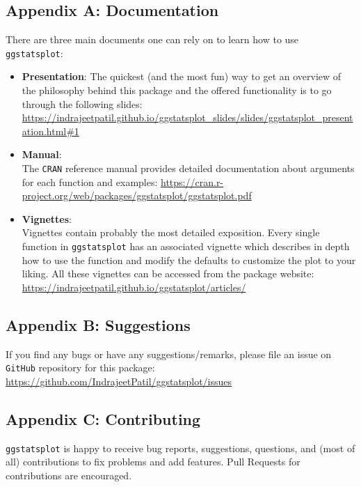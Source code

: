 \documentclass[
]{article}
\begin{document}
\hypertarget{appendix-a-documentation}{%
\subsection{Appendix A: Documentation}\label{appendix-a-documentation}}

There are three main documents one can rely on to learn how to use
\texttt{ggstatsplot}:

\begin{itemize}
\item
  \textbf{Presentation}:
  The quickest (and the most fun) way to get an overview of
  the philosophy behind this package and the offered functionality is to go
  through the following slides:
  \url{https://indrajeetpatil.github.io/ggstatsplot_slides/slides/ggstatsplot_presentation.html\#1}
\item
  \textbf{Manual}:\\
  The \texttt{CRAN} reference manual provides detailed documentation about arguments
  for each function and examples:
  \url{https://cran.r-project.org/web/packages/ggstatsplot/ggstatsplot.pdf}
\item
  \textbf{Vignettes}:\\
  Vignettes contain probably the most detailed exposition. Every single
  function in \texttt{ggstatsplot} has an associated vignette which describes in
  depth how to use the function and modify the defaults to customize the plot
  to your liking. All these vignettes can be accessed from the package
  website: \url{https://indrajeetpatil.github.io/ggstatsplot/articles/}
\end{itemize}

\hypertarget{appendix-b-suggestions}{%
\subsection{Appendix B: Suggestions}\label{appendix-b-suggestions}}

If you find any bugs or have any suggestions/remarks, please file an issue on
\texttt{GitHub} repository for this package:
\url{https://github.com/IndrajeetPatil/ggstatsplot/issues}

\hypertarget{appendix-c-contributing}{%
\subsection{Appendix C: Contributing}\label{appendix-c-contributing}}

\texttt{ggstatsplot} is happy to receive bug reports, suggestions, questions, and (most
of all) contributions to fix problems and add features. Pull Requests for
contributions are encouraged.
\end{document}
